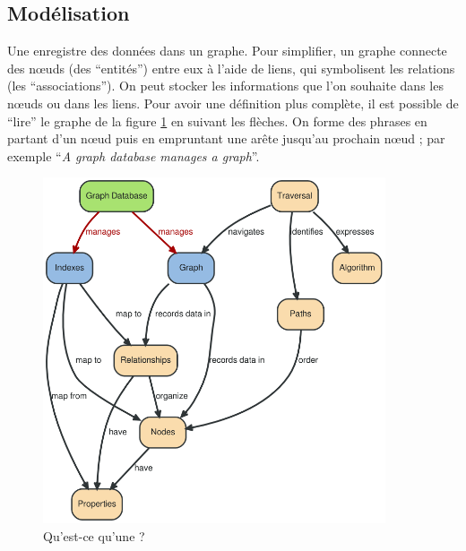 \subsection{Modélisation}
	Une \bddGraphe{} enregistre des données dans un graphe. Pour simplifier, un graphe connecte des nœuds (des \enquote{entités}) entre eux à l'aide de liens, qui symbolisent les relations (les \enquote{associations}). On peut stocker les informations que l'on souhaite dans les nœuds ou dans les liens. Pour avoir une définition plus complète, il est possible de \enquote{lire} le graphe de la figure \ref{bddGrapheSVG} en suivant les flèches. On forme des phrases en partant d'un nœud puis en empruntant une arête jusqu'au prochain nœud ; par exemple \enquote{\textit{A graph database manages a graph}}.

	\begin{figure}[H]
		\centering
		\includegraphics[width=0.9\textwidth]{images/bddGraphe.png}
		\caption{Qu'est-ce qu'une \bddGraphe{} ? \cite{bddGrapheSchema}}
		\label{bddGrapheSVG}
	\end{figure}

